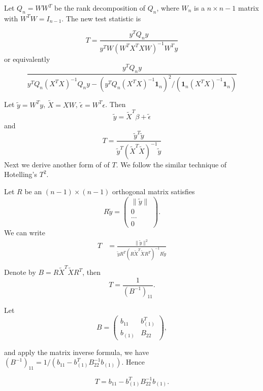 \documentclass[review]{elsarticle}
\theoremstyle{plain}
\theoremstyle{definition}
\theoremstyle{remark}
\begin{document}
Let $Q_n=WW^T$ be the rank decomposition of $Q_n$, where $W_n$ is a $n\times n-1$ matrix with $W^T W=I_{n-1}$. The new test statistic is

\[
    T=\frac{y^T Q_n y}{
        y^T W{(W^T X^T X W)}^{-1}W^T y
    } 
    \]
or equivalently
\[
    \frac{y^T Q_n y}{
        y^T Q_n{(X^T X)}^{-1}Q_n y-{(y^T Q_n{(X^T X)}^{-1}\textbf{1}_n)}^2/(\textbf{1}_n{(X^T X)}^{-1}\textbf{1}_n)
    } 
    \]


Let $\tilde{y}=W^T y$, $\tilde{X}=XW$, $\tilde{\epsilon}=W^T \epsilon$. Then
\[
    \tilde{y}=\tilde{X}^T \beta + \tilde{\epsilon}
    \]
and
\[
    T=\frac{\tilde{y}^T \tilde{y}}{
        \tilde{y}^T{(\tilde{X}^T \tilde{X})}^{-1}\tilde{y}
    }
    \]
Next we derive another form of of $T$. We follow the similar technique of Hotelling's $T^2$.


Let $R$ be an $(n-1)\times (n-1)$ orthogonal matrix satisfies 
\[
    R\tilde{y}=
    \begin{pmatrix}
        \|\tilde{y}\|\\
        0\\
        \ldots\\
        0
    \end{pmatrix}.
    \]
We can write
    \begin{equation}\label{Tformula}
        \begin{aligned}
            T&=\frac{\|\tilde{y}\|^2
        }{\tilde{y}R^T{(R\tilde{X}^T\tilde{X}R^T)}^{-1}R\tilde{y}}\\
        \end{aligned}
    \end{equation}
Denote by $B=R\tilde{X}^T \tilde{X} R^T$, then
\[
    T=\frac{1}{{(B^{-1})}_{11}}.
    \]

Let
\[
    B=\begin{pmatrix} 
        b_{11} & b_{(1)}^T\\
        b_{(1)} & B_{22}
    \end{pmatrix},
    \]

and apply the matrix inverse formula, we have ${(B^{-1})}_{11}=1/(b_{11}-b_{(1)}^T B_{22}^{-1}b_{(1)})$. Hence

\[
   T= b_{11}-b_{(1)}^T B_{22}^{-1}b_{(1)}.
    \]
\end{document}
